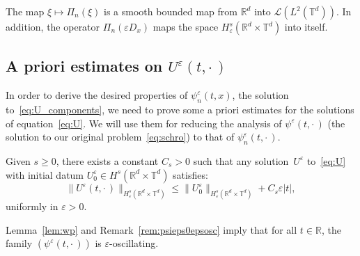 \documentclass[AHL,Unicode,longabstracts]{cedram}
\newcommand*\R{{\mathbb R}}
\newcommand*\T{{\mathbb T}}
\newcommand*\eps{\varepsilon}
\numberwithin{equation}{section}
\begin{document}
\begin{lemm}\label{boundednessdPi}
The map $\xi\mapsto \Pi_n(\xi)$ is a smooth bounded map from $\R^d$ into ${\mathcal L} (L^2(\T^d))$. In addition, the operator $\Pi_n(\eps D_x)$ maps the space $H^s_\eps(\R^d\times\T^d)$ into itself.
\end{lemm}



\subsection{A priori estimates on \texorpdfstring{$U^\eps(t,\cdot\,)$}{U eps(t,.)} }

In order to derive the desired properties of $\psi^\eps_n(t,x)$, the solution to~\eqref{eq:U_components}, we need to prove some a priori estimates for the solutions of equation~\eqref{eq:U}. We will use them for reducing the analysis of $\psi^\eps(t,\cdot\,)$ (the solution to our original problem~\eqref{eq:schro}) to that of $\psi^\eps_n(t,\cdot\,)$.


\begin{lemm}\label{lem:wp}
Given $s\geq 0$, there exists a constant $C_s>0$ such that any solution~$U^\eps$ to~\eqref{eq:U} with initial datum $U^\eps_0\in H^s(\R^d\times\T^d)$ satisfies:
\begin{equation}\label{eq:wpxy}
\|U^\eps(t,\cdot\,)\|_{H^s_\eps(\R^d\times\T^d)}\leq \|U^\eps_0\|_{H^s_\eps(\R^d\times\T^d)}+C_s\eps|t|,
\end{equation}
uniformly in $\eps >0$.
\end{lemm}

\begin{coro}\label{cor:psiepsosc}
Lemma~\ref{lem:wp} and Remark~\ref{rem:psieps0epsosc} imply that for all $t\in\R$, the family $(\psi^\eps(t,\cdot\,))$ is $\eps$-oscillating.
\end{coro}
\end{document}
